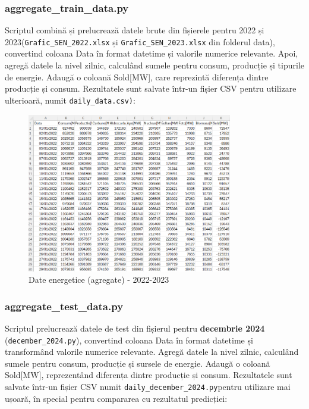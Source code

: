 \documentclass[a4paper,12pt]{article}
\begin{document}
\subsubsection{aggregate\_train\_data.py}
Scriptul combină și prelucrează datele brute din fișierele pentru 2022 și 2023(\texttt{Grafic\_SEN\_2022.xlsx} și \texttt{Grafic\_SEN\_2023.xlsx} din folderul data), convertind coloana Data în format datetime și valorile numerice relevante. Apoi, agregă datele la nivel zilnic, calculând sumele pentru consum, producție și tipurile de energie. Adaugă o coloană Sold[MW], care reprezintă diferența dintre producție și consum. Rezultatele sunt salvate într-un fișier CSV pentru utilizare ulterioară, numit \texttt{daily\_data.csv)}:


\begin{figure}
    \centering
    \includegraphics[width=0.8\textwidth]{img1.png}
    \caption{Date energetice (agregate) - 2022-2023}
    \label{fig:date zilnice 2022-2023}
\end{figure}

\subsubsection{aggregate\_test\_data.py}
Scriptul prelucrează datele de test din fișierul pentru \textbf{decembrie 2024} (\texttt{december\_2024.py}), convertind coloana Data în format datetime și transformând valorile numerice relevante. Agregă datele la nivel zilnic, calculând sumele pentru consum, producție și sursele de energie. Adaugă o coloană Sold[MW], reprezentând diferența dintre producție și consum. Rezultatele sunt salvate într-un fișier CSV numit \texttt{daily\_december\_2024.py}pentru utilizare mai ușoară, în special pentru compararea cu rezultatul predicției:
\end{document}
